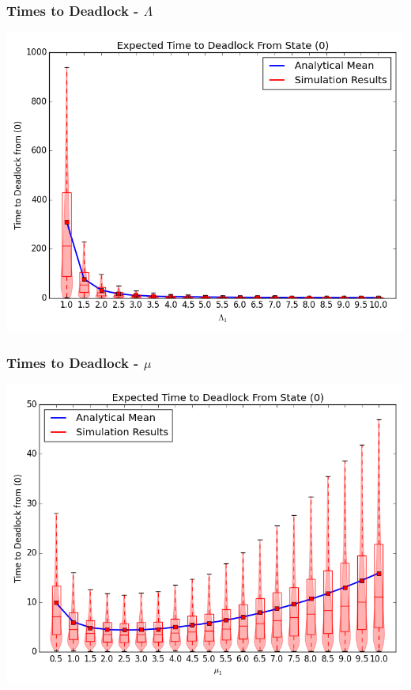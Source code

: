 \documentclass{beamer}
\begin{document}
\begin{frame}
    \frametitle{Times to Deadlock - $\Lambda$}
    \includegraphics[width=\textwidth]{varyL1_1node}
\end{frame}
\begin{frame}
    \frametitle{Times to Deadlock - $\mu$}
    \includegraphics[width=\textwidth]{varymu1_1node}
\end{frame}
\end{document}
